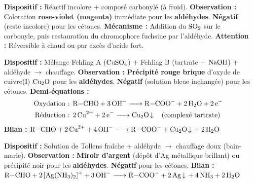 \documentclass[11pt]{article}
\begin{document}
\begin{experience}
\textbf{Dispositif :} Réactif incolore + composé carbonylé (à froid).
\textbf{Observation :} Coloration \textbf{rose-violet (magenta)} immédiate pour les \textbf{aldéhydes}. \textbf{Négatif} (reste incolore) pour les cétones.
\textbf{Mécanisme :} Addition du $\ce{SO2}$ sur le carbonyle, puis restauration du chromophore fuchsine par l'aldéhyde.
\textbf{Attention :} Réversible à chaud ou par excès d'acide fort.
\end{experience}

\begin{experience}
\textbf{Dispositif :} Mélange Fehling A ($\ce{CuSO4}$) + Fehling B (tartrate + $\ce{NaOH}$) + aldéhyde $\rightarrow$ chauffage.
\textbf{Observation :} \textbf{Précipité rouge brique} d'oxyde de cuivre(I) $\ce{Cu2O}$ pour les \textbf{aldéhydes}. \textbf{Négatif} (solution bleue inchangée) pour les cétones.
\textbf{Demi-équations :}
\begin{align*}
\text{Oxydation : } & \ce{R-CHO + 3 OH- -> R-COO- + 2 H2O + 2 e-} \\
\text{Réduction : } & \ce{2 Cu^2+ + 2 e- -> Cu2O v} \quad (\text{complexé tartrate})
\end{align*}
\textbf{Bilan :} $\ce{R-CHO + 2 Cu^2+ + 4 OH- -> R-COO- + Cu2O v + 2 H2O}$
\end{experience}

\begin{experience}
\textbf{Dispositif :} Solution de Tollens fraîche + aldéhyde $\rightarrow$ chauffage doux (bain-marie).
\textbf{Observation :} \textbf{Miroir d'argent} (dépôt d'Ag métallique brillant) ou précipité noir pour les \textbf{aldéhydes}. \textbf{Négatif} pour les cétones.
\textbf{Bilan :} $\ce{R-CHO + 2 [Ag(NH3)2]+ + 3 OH- -> R-COO- + 2 Ag v + 4 NH3 + 2 H2O}$
\end{experience}
\end{document}
